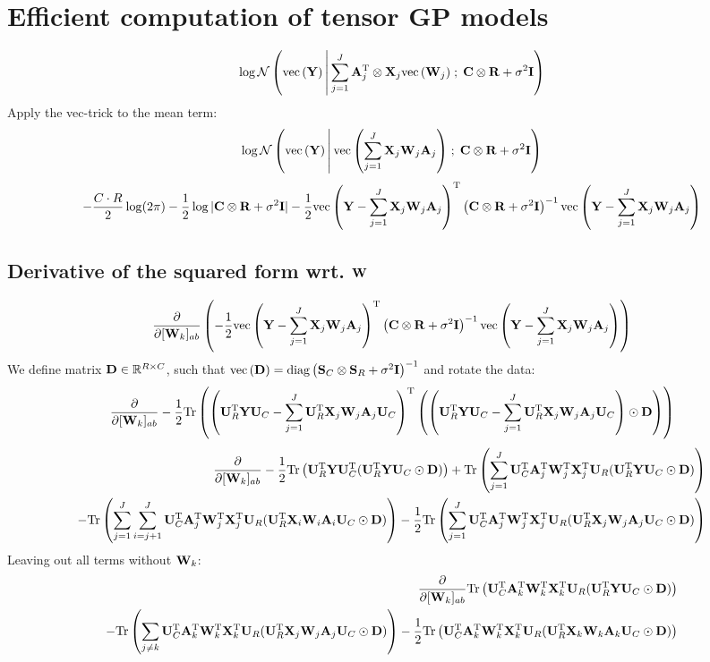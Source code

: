 \documentclass{article}
\newcommand{\B}[1]{{\bf{#1}}}
\newcommand\tr{\mathrm{Tr}}
\newcommand\Normal[3]{\normal{#1}{{#2}\;;\;{#3}}}
\newcommand\ve[1]{\text{vec}\left(#1\right)}
\newcommand\Real{\mathbb{R}}
\newcommand{\Ykron}{\B{U}_R^\T\B{Y}\B{U}_C}
\newcommand{\XWAkron}[1]{\B{U}_R^\T\B{X}_{#1}\B{W}_{#1}\B{A}_{#1}\B{U}_C}
\newcommand{\XWAkronT}[1]{\B{U}_C^\T\B{A}_{#1}^\T\B{W}_{#1}^{\T}\B{X}_{#1}^{\T}\B{U}_R}
\begin{document}
\section{Efficient computation of tensor GP models}
\begin{equation}
\log\Normal{\ve{\B{Y}}}{\sum_{j=1}^J\B{A}^{\T}_j\otimes\B{X}_j\ve{\B{W}_j}}{\B{C}\otimes\B{R}
+ \sigma^2\B{I}}
\end{equation}
Apply the vec-trick to the mean term:
\begin{equation}
\log\Normal{\ve{\B{Y}}}{\ve{\sum_{j=1}^J\B{X}_j\B{W}_j\B{A}_j}}{\B{C}\otimes\B{R}
+ \sigma^2\B{I}}
\end{equation}
\begin{equation}
-\frac{C\cdot R}{2}\log(2\pi)-\frac{1}{2}\log|\B{C}\otimes\B{R} +
\sigma^2\B{I}|
-\frac{1}{2}\ve{\B{Y} -\sum_{j=1}^J\B{X}_j\B{W}_j\B{A}_j}^\T\left(\B{C}\otimes\B{R} +
\sigma^2\B{I}\right)^{-1}\ve{\B{Y} -\sum_{j=1}^J\B{X}_j\B{W}_j\B{A}_j}
\end{equation}
\subsection{Derivative of the squared form wrt. $\B{W}$}
\begin{equation}
\frac{\partial}{\partial [\B{W}_k]_{ab}}\left(-\frac{1}{2}\ve{\B{Y} -\sum_{j=1}^J\B{X}_j\B{W}_j\B{A}_j}^\T\left(\B{C}\otimes\B{R} +
\sigma^2\B{I}\right)^{-1}\ve{\B{Y} -\sum_{j=1}^J\B{X}_j\B{W}_j\B{A}_j}\right)
\end{equation}
We define matrix $\B{D}\in\Real^{R\times C}$, such that $\ve{\B{D}} = \diag\left(\B{S}_C\otimes\B{S}_R +
\sigma^2\B{I}\right)^{-1}$ and rotate the data:
\begin{equation}
\frac{\partial}{\partial [\B{W}_k]_{ab}}
-\frac{1}{2}\tr\left(\left(\Ykron
    -\sum_{j=1}^J\XWAkron{j}\right)^\T\left(\left(\Ykron
      -\sum_{j=1}^J\XWAkron{j}\right)\odot \B{D}\right)\right)
\end{equation}
\begin{eqnarray}\nonumber
\frac{\partial}{\partial [\B{W}_k]_{ab}}
-\frac{1}{2}\tr\left(\Ykron^\T (\Ykron \odot \B{D})\right)
    +\tr\left( \sum_{j=1}^J\XWAkronT{j}(\Ykron \odot \B{D})\right) \\
-\tr\left( \sum_{j=1}^J\sum_{i=j+1}^J\XWAkronT{j}(\XWAkron{i} \odot
  \B{D}) \right) 
-\frac{1}{2}\tr\left(\sum_{j=1}^J\XWAkronT{j}(\XWAkron{j} \odot \B{D}) \right)
\end{eqnarray}
Leaving out all terms without $\B{W}_k$:
\begin{eqnarray}\nonumber
\frac{\partial}{\partial [\B{W}_k]_{ab}}
    \tr\left( \XWAkronT{k}(\Ykron \odot \B{D})\right) \\
-\tr\left( \sum_{j\neq k}\XWAkronT{k}(\XWAkron{j} \odot
  \B{D}) \right) 
-\frac{1}{2}\tr\left(\XWAkronT{k}(\XWAkron{k} \odot \B{D}) \right)
\end{eqnarray}
\end{document}
